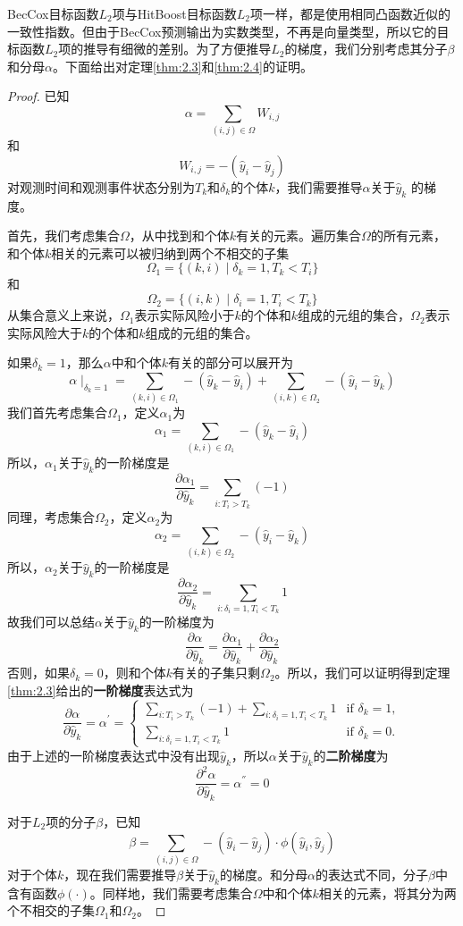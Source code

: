 BecCox目标函数$L_2$项与HitBoost目标函数$L_2$项一样，都是使用相同凸函数近似的一致性指数。但由于BecCox预测输出为实数类型，不再是向量类型，所以它的目标函数$L_2$项的推导有细微的差别。为了方便推导$L_2$的梯度，我们分别考虑其分子$\beta$和分母$\alpha$。下面给出对定理\ref{thm:2.3}和\ref{thm:2.4}的证明。
\begin{proof}
已知$$\alpha = \sum_{(i,j)\in \Omega} W_{i,j}$$ 和 $$W_{i,j}=-(\hat{y}_i-\hat{y}_j)$$对观测时间和观测事件状态分别为$T_k$和$\delta_k$的个体$k$，我们需要推导$\alpha$关于$\hat{y}_k$ 的梯度。

首先，我们考虑集合$\Omega$，从中找到和个体$k$有关的元素。遍历集合$\Omega$的所有元素，和个体$k$相关的元素可以被归纳到两个不相交的子集$$\Omega_1=\{(k,i) \mid \delta_k=1,T_k < T_i\}$$ 和 $$\Omega_2=\{(i,k) \mid \delta_i=1,T_i < T_k\}$$ 从集合意义上来说，$\Omega_1$表示实际风险小于$k$的个体和$k$组成的元组的集合，$\Omega_2$表示实际风险大于$k$的个体和$k$组成的元组的集合。

如果$\delta_k = 1$，那么$\alpha$中和个体$k$有关的部分可以展开为$$\alpha \mid_{\delta_k=1}=\sum_{(k,i)\in \Omega_1} -(\hat{y}_k-\hat{y}_i) + \sum_{(i,k)\in \Omega_2} -(\hat{y}_i-\hat{y}_k) $$ 我们首先考虑集合$\Omega_1$，定义$\alpha_1$为$$\alpha_1 = \sum_{(k,i)\in \Omega_1} -(\hat{y}_k-\hat{y}_i)$$ 所以，$\alpha_1$关于$\hat{y}_k$的一阶梯度是$$\frac{\partial \alpha_1}{\partial \hat{y}_k} = \sum\limits_{i: T_i>T_k}(-1)$$ 同理，考虑集合$\Omega_2$，定义$\alpha_2$为$$\alpha_2 = \sum_{(i,k)\in \Omega_2} -(\hat{y}_i-\hat{y}_k)$$ 所以，$\alpha_2$关于$\hat{y}_k$的一阶梯度是$$\frac{\partial \alpha_2}{\partial \hat{y}_k} = \sum\limits_{i: \delta_i=1,T_i<T_k} 1$$ 故我们可以总结$\alpha$关于$\hat{y}_k$的一阶梯度为$$\frac{\partial \alpha}{\partial \hat{y}_k} = \frac{\partial \alpha_1}{\partial \hat{y}_k} + \frac{\partial \alpha_2}{\partial \hat{y}_k}$$ 否则，如果$\delta_k = 0$，则和个体$k$有关的子集只剩$\Omega_2$。所以，我们可以证明得到定理\ref{thm:2.3}给出的\textbf{一阶梯度}表达式为$$
\frac{\partial \alpha}{\partial \hat{y}_k}=\alpha^{'}=
\begin{cases}
\sum\limits_{i: T_i>T_k}(-1) + \sum\limits_{i: \delta_i=1,T_i<T_k} 1 & \text{if } \delta_k = 1,\\
\sum\limits_{i: \delta_i=1,T_i<T_k} 1 & \text{if } \delta_k = 0.
\end{cases}
$$ 由于上述的一阶梯度表达式中没有出现$\hat{y}_k$，所以$\alpha$关于$\hat{y}_k$的\textbf{二阶梯度}为$$
\frac{\partial^2 \alpha}{\partial \hat{y}_k}=\alpha^{''}=0
$$

对于$L_2$项的分子$\beta$，已知$$\beta = \sum_{(i,j)\in \Omega} -(\hat{y}_i-\hat{y}_j) \cdot \phi(\hat{y}_i, \hat{y}_j)$$ 对于个体$k$，现在我们需要推导$\beta$关于$\hat{y}_k$的梯度。和分母$\alpha$的表达式不同，分子$\beta$中含有函数$\phi(\cdot)$。同样地，我们需要考虑集合$\Omega$中和个体$k$相关的元素，将其分为两个不相交的子集$\Omega_1$和$\Omega_2$。


\end{proof}

